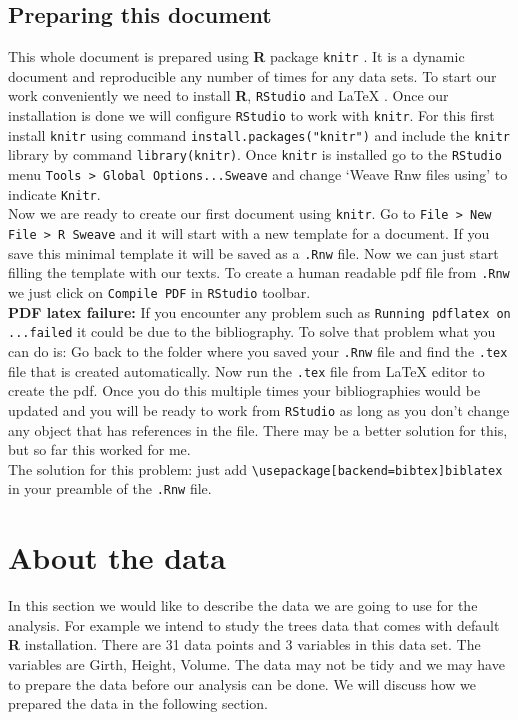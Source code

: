 \documentclass{article}\usepackage[]{graphicx}\usepackage[]{color}
\begin{document}
\subsection{Preparing this document} This whole document is prepared using \textbf{R}  \cite{R-base} package \texttt{knitr} \cite{R-knitr}. It is a dynamic document and reproducible any number of times for any data sets. To start our work conveniently we need to install \textbf{R}, \texttt{RStudio} and \LaTeX{} \cite{lamport94} . Once our installation is done we will configure \texttt{RStudio} to work with \texttt{knitr}. For this first install \texttt{knitr} using command \texttt{install.packages("knitr")} and include the \texttt{knitr} library by command \texttt{library(knitr)}. Once \texttt{knitr} is installed go to the \texttt{RStudio} menu \texttt{Tools > Global Options...Sweave} and change `Weave Rnw files using' to indicate \texttt{Knitr}.\\

Now we are ready to create our first document using \texttt{knitr}. Go to \texttt{File > New File > R Sweave} and it will start with a new template for a document. If you save this minimal template it will be saved as a \texttt{.Rnw} file. Now we can just start filling the template with our texts. To create a human readable pdf file from \texttt{.Rnw} we just click on \texttt{Compile PDF} in \texttt{RStudio} toolbar. \\

{\bf PDF latex failure:} If you encounter any problem such as \texttt{Running pdflatex on ...failed} it could be due to the bibliography. To solve that problem what you can do is: Go back to the folder where you saved your \texttt{.Rnw} file and find the \texttt{.tex} file that is created automatically. Now run the \texttt{.tex} file from \LaTeX{} editor to create the pdf. Once you do this multiple times your bibliographies would be updated and you will be ready to work from \texttt{RStudio} as long as you don't change any object that has references in the file. There may be a better solution for this, but so far this worked for me. \\

The solution for this problem: just add \texttt{\textbackslash usepackage[backend=bibtex]{biblatex}} in your preamble of the \texttt{.Rnw} file.

\section{About the data} In this section we would like to describe the data we are going to use for the analysis. For example we intend to study the trees data that comes with default \textbf{R} installation. There are 31 data points and 3 variables in this data set. The variables are Girth, Height, Volume. The data may not be tidy and we may have to prepare the data before our analysis can be done. We will discuss how we prepared the data in the following section.
\end{document}
